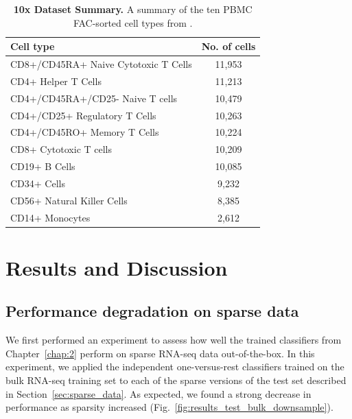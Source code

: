  \begin{table}[h!]
    \begin{center}
    \begin{tabular}{ |l|c| } 
    \hline
    \textbf{Cell type} & \textbf{No. of cells} \\ \hline
    CD8+/CD45RA+ Naive Cytotoxic T Cells & 11,953  \\
    CD4+ Helper T Cells & 11,213 \\
    CD4+/CD45RA+/CD25- Naive T cells & 10,479  \\
    CD4+/CD25+ Regulatory T Cells & 10,263  \\
    CD4+/CD45RO+ Memory T Cells & 10,224 \\
    CD8+ Cytotoxic T cells & 10,209  \\
    CD19+ B Cells & 10,085  \\
    CD34+ Cells & 9,232  \\
    CD56+ Natural Killer Cells & 8,385 \\    
    CD14+ Monocytes & 2,612 \\
     \hline
    \end{tabular}
    \end{center}
    \caption{\textbf{10x Dataset Summary.} A summary of the ten PBMC FAC-sorted cell types from \cite{Zhang2018}.}
    \label{tab:10x_pbmc}
    \end{table}


 
\section{Results and Discussion}

\subsection{Performance degradation on sparse data}\label{sec:sparse_test}
 
 We first performed an experiment to assess how well the trained classifiers from Chapter~\ref{chap:2} perform on sparse RNA-seq data out-of-the-box.  In this experiment, we applied the independent one-versus-rest classifiers trained on the bulk RNA-seq training set to each of the sparse versions of the test set described in Section~\ref{sec:sparse_data}.  As expected, we found a strong decrease in performance as sparsity increased (Fig.~\ref{fig:results_test_bulk_downsample}).  

